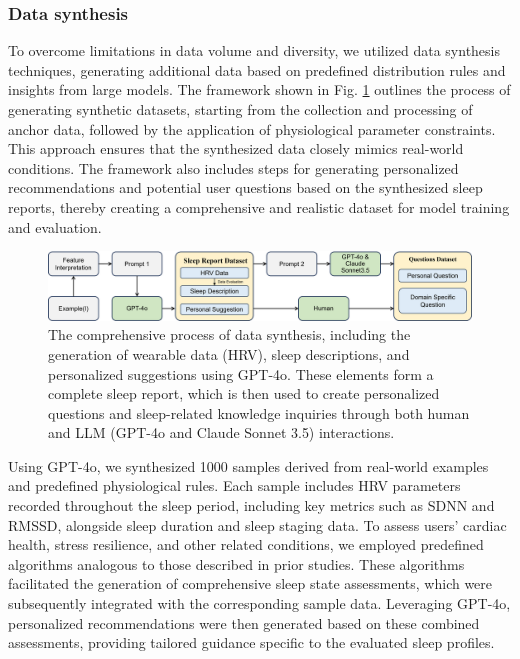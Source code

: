 \documentclass[preprint,12pt]{elsarticle}
\begin{document}
\subsubsection{Data synthesis}
To overcome limitations in data volume and diversity, we utilized data synthesis techniques, generating additional data based on predefined distribution rules and insights from large models. The framework shown in Fig. \ref{fig3} outlines the process of generating synthetic datasets, starting from the collection and processing of anchor data, followed by the application of physiological parameter constraints. This approach ensures that the synthesized data closely mimics real-world conditions. The framework also includes steps for generating personalized recommendations and potential user questions based on the synthesized sleep reports, thereby creating a comprehensive and realistic dataset for model training and evaluation.
\begin{figure}[ht]
\centering
\includegraphics[width=\columnwidth]{datasyhths1.png}
\caption{The comprehensive process of data synthesis, including the generation of wearable data (HRV), sleep descriptions, and personalized suggestions using GPT-4o. These elements form a complete sleep report, which is then used to create personalized questions and sleep-related knowledge inquiries through both human and LLM (GPT-4o and Claude Sonnet 3.5) interactions.}
\label{fig3}
\end{figure}

Using GPT-4o, we synthesized 1000 samples derived from real-world examples and predefined physiological rules. Each sample includes HRV parameters recorded throughout the sleep period, including key metrics such as SDNN and RMSSD, alongside sleep duration and sleep staging data. To assess users' cardiac health, stress resilience, and other related conditions, we employed predefined algorithms analogous to those described in prior studies. These algorithms facilitated the generation of comprehensive sleep state assessments, which were subsequently integrated with the corresponding sample data. Leveraging GPT-4o, personalized recommendations were then generated based on these combined assessments, providing tailored guidance specific to the evaluated sleep profiles.
\end{document}
